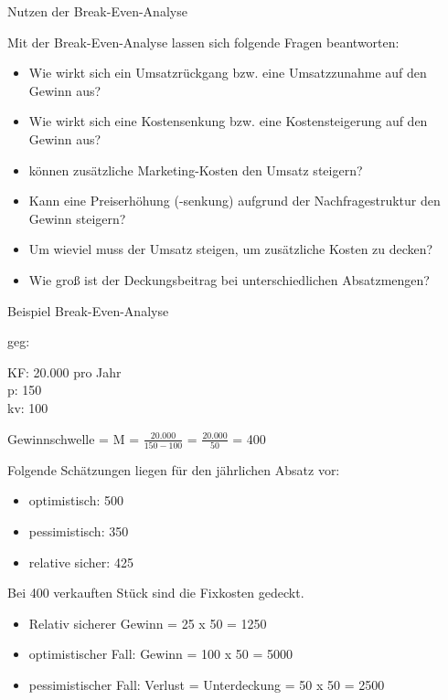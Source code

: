 \documentclass[12pt,ngerman,a4paper,ignorenonframetext,]{beamer}
\providecommand{\tightlist}{%
  \setlength{\itemsep}{0pt}\setlength{\parskip}{0pt}}
\begin{document}
\begin{frame}{Nutzen der Break-Even-Analyse}
\protect\hypertarget{nutzen-der-break-even-analyse}{}

Mit der Break-Even-Analyse lassen sich folgende Fragen beantworten:

\begin{itemize}
\tightlist
\item
  Wie wirkt sich ein Umsatzrückgang bzw. eine Umsatzzunahme auf den
  Gewinn aus?
\item
  Wie wirkt sich eine Kostensenkung bzw. eine Kostensteigerung auf den
  Gewinn aus?
\item
  können zusätzliche Marketing-Kosten den Umsatz steigern?
\item
  Kann eine Preiserhöhung (-senkung) aufgrund der Nachfragestruktur den
  Gewinn steigern?
\item
  Um wieviel muss der Umsatz steigen, um zusätzliche Kosten zu decken?
\item
  Wie groß ist der Deckungsbeitrag bei unterschiedlichen Absatzmengen?
\end{itemize}

\end{frame}

\begin{frame}{Beispiel Break-Even-Analyse}
\protect\hypertarget{beispiel-break-even-analyse}{}

geg:

KF: 20.000 pro Jahr\\
p: 150\\
kv: 100

Gewinnschwelle = M = \(\frac{ 20.000 }{ 150-100 }\) =
\(\frac{ 20.000 }{ 50 }\) = 400

Folgende Schätzungen liegen für den jährlichen Absatz vor:

\begin{itemize}
\tightlist
\item
  optimistisch: 500
\item
  pessimistisch: 350
\item
  relative sicher: 425
\end{itemize}

Bei 400 verkauften Stück sind die Fixkosten gedeckt.

\begin{itemize}
\tightlist
\item
  Relativ sicherer Gewinn = 25 x 50 = 1250
\item
  optimistischer Fall: Gewinn = 100 x 50 = 5000
\item
  pessimistischer Fall: Verlust = Unterdeckung = 50 x 50 = 2500
\end{itemize}

\end{frame}
\end{document}
